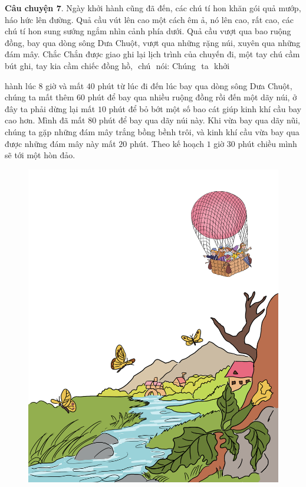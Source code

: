 \begin{multicols}{2}
\begin{figure}[H]
			\vspace*{-5pt}
		\end{figure}
		\textbf{\color{toancuabi}Câu chuyện $\pmb{7.}$} Ngày khởi hành cũng đã đến, các chú tí hon khăn gói quả mướp, háo hức lên đường. Quả cầu vút lên cao một cách êm ả, nó lên cao, rất cao, các chú tí hon sung sướng ngắm nhìn cảnh phía dưới. Quả cầu vượt qua bao ruộng đồng, bay qua dòng sông Dưa Chuột, vượt qua những rặng núi, xuyên qua những đám mây. Chắc Chắn được giao ghi lại lịch trình của chuyến đi, một tay chú cầm bút ghi, tay kia cầm chiếc đồng hồ, \,\,chú \,\,nói: Chúng\,\, ta\,\, khởi
	\end{multicols}
	hành lúc $8$ giờ và mất $40$ phút từ lúc đi đến lúc bay qua dòng sông Dưa Chuột, chúng ta mất thêm $60$ phút để bay qua nhiều ruộng đồng rồi đến một dãy núi, ở đây ta phải dừng lại mất $10$ phút để bỏ bớt một số bao cát giúp kinh khí cầu bay cao hơn.  Mình đã mất $80$ phút để bay qua dãy núi này. Khi vừa bay qua dãy nũi, chúng ta gặp những đám mây trắng bồng bềnh trôi, và kinh khí cầu vừa bay qua được những đám mây này mất $20$ phút. Theo kế hoạch $1$ giờ $30$ phút chiều mình sẽ tới một hòn đảo.
	\vskip 0.1cm
	\begin{figure}
		\centering
		\vspace*{-25pt}
		\captionsetup{labelformat= empty, justification=centering}
		\includegraphics[width=1\linewidth]{Hinh23_KinhKhiCau}
		\vspace*{-20pt}
	\end{figure}
